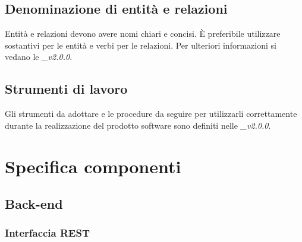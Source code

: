\documentclass[12pt,a4paper]{article}
\begin{document}

\subsection{Denominazione di entità e relazioni}
Entità e relazioni devono avere nomi chiari e concisi. È preferibile utilizzare sostantivi
per le entità e verbi per le relazioni. Per ulteriori informazioni si vedano
le \textit{\NdP\_v2.0.0}.

\subsection{Strumenti di lavoro}
Gli strumenti da adottare e le procedure da seguire per utilizzarli correttamente durante la realizzazione 
del prodotto software sono definiti nelle \textit{\NdP\_v2.0.0}.

\newpage
\section{Specifica componenti}

\subsection{Back-end}

\subsubsection{Interfaccia REST}
\end{document}
